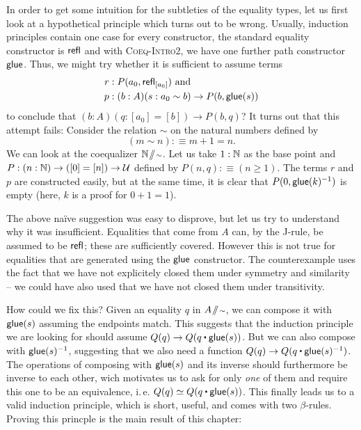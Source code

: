 In order to get some intuition for the subtleties of the equality types,
let us first look at a hypothetical principle which turns out to be wrong.
Usually, induction principles contain one case for every constructor,
the standard equality constructor is $\mathsf{refl}$ and with \textsc{Coeq-Intro2}, we
have one further path constructor $\mathsf{glue}$.
Thus, we might try whether it is sufficient to assume terms
\begin{align*}
r &: P(a_0, \mathsf{refl}_{[a_0]}) \text{ and}\\
p &: (b : A)(s : a_0 \sim b) \to P(b, \mathsf{glue}(s))
\end{align*}
to conclude that $(b : A)(q : [a_0] = [b]) \to P(b, q)$?
It turns out that this attempt fails:
Consider the relation $\sim$ on the natural numbers defined by
\begin{equation*}
(m \sim n) :\equiv m + 1 = n \text{.}
\end{equation*}
We can look at the coequalizer $\mathbb{N} \! \sslash \! {\scriptstyle \sim}$.
Let us take $1 : \mathbb{N}$ as the base point and $P : (n : \mathbb{N}) \to ([0] = [n]) \to \mathcal{U}$
defined by $P(n,q) :\equiv (n \geq 1)$.
The terms $r$ and $p$ are constructed easily, but at the same time, it is clear
that $P(0, \mathsf{glue}(k)^{-1})$ is empty (here, $k$ is a proof for $0 + 1 = 1$).

The above naïve suggestion was easy to disprove, but let us try to understand
why it was insufficient.
Equalities that come from $A$ can, by the J-rule, be assumed to be $\mathsf{refl}$;
these are sufficiently covered.
However this is not true for equalities that are generated using the $\mathsf{glue}$ constructor.
The counterexample uses the fact that we have not explicitely closed them under symmetry
and similarity -- we could have also used that we have not closed them
under transitivity.

How could we fix this? Given an equality $q$ in $A \! \sslash \! {\scriptstyle \sim}$, we can compose it
with $\mathsf{glue}(s)$ assuming the endpoints match.
This suggests that the induction principle we are looking for should assume
$Q(q) \to Q(q \ct \glue(s))$.
But we can also compose with $\mathsf{glue}(s)^{-1}$,
suggesting that we also need a function $Q(q)  \to Q(q \ct \glue(s)\inv)$.
The operations of composing with $\mathsf{glue}(s)$ and its inverse should furthermore
be inverse to each other,
wich motivates us to ask for only \emph{one} of them and require this one to be
an equivalence, i.\,e. $Q(q) \simeq Q(q \ct \glue(s))$.
This finally leads us to a valid induction principle, which is short, useful, and
comes with two $\beta$-rules.
Proving this princple is the main result of this chapter:

